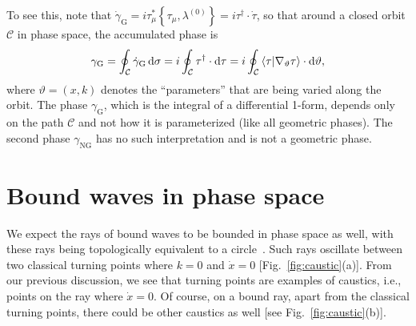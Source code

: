 To see this, note that $\dot{\gamma}_{\text{G}} = i\tau^{*}_{\mu}\left\{\tau_{\mu},\lambda^{(0)}\right\} = i\tau^{\dagger}\cdot\dot{\tau}$, so that around a closed orbit $\mathcal{C}$ in phase space, the accumulated phase is
%
\begin{equation}
\gamma_{\text{G}}
= \oint_{\mathcal{C}} \dot{\gamma}_{\text{G}}\,\mathrm{d}{\sigma}
= i\oint_{\mathcal{C}} \tau^{\dagger}\cdot\mathrm{d}{\tau}
= i\oint_{\mathcal{C}} \mathinner{\langle{\tau |\nabla_{\vartheta}\tau}\rangle}
\cdot\mathrm{d}\vartheta,
\end{equation}
%
where $\vartheta = (x, k)$ denotes the ``parameters'' that are being varied along the orbit.
The phase $\gamma_{\text{G}}$, which is the integral of a differential 1-form, depends only on the path $\mathcal{C}$ and not how it is parameterized (like all geometric phases).
The second phase $\gamma_{\text{NG}}$ has no such interpretation and is not a geometric phase.

\section{Bound waves in phase space}
\label{sec:bound}

We expect the rays of bound waves to be bounded in phase space as well, with these rays being topologically equivalent to a circle~\cite{keller1958,mcdonald1988}.
Such rays oscillate between two classical turning points where $k = 0$ and $\dot{x} = 0$ [Fig.~\ref{fig:caustic}(a)].
From our previous discussion, we see that turning points are examples of caustics, i.e., points on the ray where $\dot{x} = 0$.
Of course, on a bound ray, apart from the classical turning points, there could be other caustics as well [see Fig.~\ref{fig:caustic}(b)].


